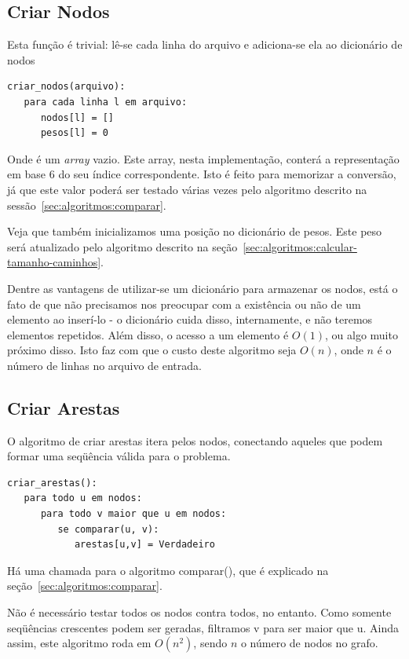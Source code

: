 \documentclass[12pt]{article}
\begin{document}
\subsection{Criar Nodos}\label{sec:algoritmos:criar-nodos}
Esta fun\c{c}ão é trivial: lê-se cada linha do arquivo e adiciona-se ela ao dicionário de nodos
\begin{lstlisting}
criar_nodos(arquivo):
   para cada linha l em arquivo:
      nodos[l] = []
      pesos[l] = 0
\end{lstlisting}

Onde {\sf []} é um \textit{array} vazio. Este array, nesta implementa\c{c}ão, conterá a representa\c{c}ão em base 6 do seu índice correspondente. Isto é feito para memorizar a conversão, já que este valor poderá ser testado várias vezes pelo algoritmo descrito na sessão~\ref{sec:algoritmos:comparar}.

Veja que também inicializamos uma posi\c{c}ão no dicionário de pesos. Este peso será atualizado pelo algoritmo descrito na se\c{c}ão~\ref{sec:algoritmos:calcular-tamanho-caminhos}.

Dentre as vantagens de utilizar-se um dicionário para armazenar os nodos, está o fato de que não precisamos nos preocupar com a existência ou não de um elemento ao inserí-lo - o dicionário cuida disso, internamente, e não teremos elementos repetidos. Além disso, o acesso a um elemento é $O(1)$, ou algo muito próximo disso. Isto faz com que o custo deste algoritmo seja $O(n)$, onde $n$ é o número de linhas no arquivo de entrada. %

\subsection{Criar Arestas}\label{sec:algoritmos:criar-arestas}
O algoritmo de criar arestas itera pelos nodos, conectando aqueles que podem formar uma seqüência válida para o problema.

\begin{lstlisting}
criar_arestas():
   para todo u em nodos:
      para todo v maior que u em nodos:
         se comparar(u, v):
            arestas[u,v] = Verdadeiro
\end{lstlisting}

Há uma chamada para o algoritmo {\sf comparar()}, que é explicado na se\c{c}ão~\ref{sec:algoritmos:comparar}.

Não é necessário testar todos os nodos contra todos, no entanto. Como somente seqüências crescentes podem ser geradas, filtramos {\sf v} para ser maior que {\sf u}. Ainda assim, este algoritmo roda em $O(n^2)$, sendo $n$ o número de nodos no grafo.
\end{document}
